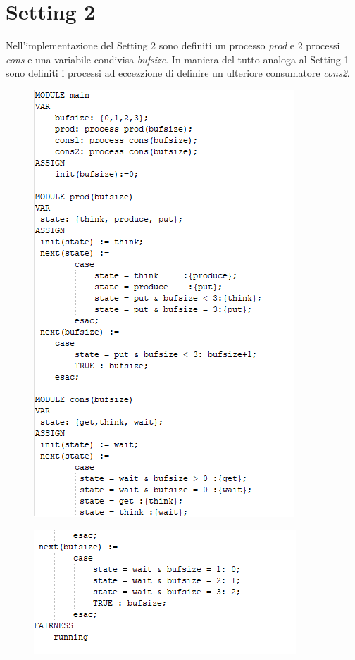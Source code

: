 \documentclass{article}
\begin{document}
\section{Setting 2}
Nell'implementazione del Setting 2 sono definiti un processo \textit{prod} e 2 processi \textit{cons} e una variabile condivisa \textit{bufsize}. In maniera del tutto analoga al Setting 1 sono definiti i processi ad eccezzione di definire un ulteriore consumatore \textit{cons2}.
\begin{figure}[h] 
\centering
\includegraphics[scale=0.8]{setting21.png}
\end{figure}
\begin{figure}[h] 
\centering
\includegraphics[scale=0.9]{setting22.png}
\end{figure}
\end{document}
